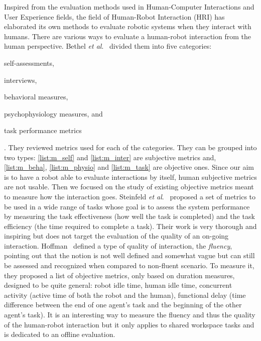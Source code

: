 \documentclass[a4paper,11pt,twoside]{StyleThese}
\begin{document}
Inspired from the evaluation methods used in Human-Computer Interactions and User Experience fields, the field of Human-Robot Interaction (HRI) has elaborated its own methods to evaluate robotic systems when they interact with humans. There are various ways to evaluate a human-robot interaction from the human perspective. Bethel \textit{et al}.~\cite{bethel_2010_review} divided them into five categories: \begin{inlineEnumerate}
	\item self-assessments,\label{list:m_self}
	\item interviews,\label{list:m_inter}
	\item behavioral measures,\label{list:m_beha}
	\item psychophysiology measures, and\label{list:m_physio}
	\item task performance metrics\label{list:m_task}
\end{inlineEnumerate}. They reviewed metrics used for each of the categories. They can be grouped into two types: \ref{list:m_self} and \ref{list:m_inter} are subjective metrics and, \ref{list:m_beha}, \ref{list:m_physio} and \ref{list:m_task} are objective ones. Since our aim is to have a robot able to evaluate interactions by itself, human subjective metrics are not usable. Then we focused on the study of existing objective metrics meant to measure how the interaction goes. Steinfeld \textit{et al}.~\cite{steinfeld_2006_common} proposed a set of metrics to be used in a wide range of tasks whose goal is to assess the system performance by measuring the task effectiveness (\ie how well the task is completed) and the task efficiency (\ie the time required to complete a task). Their work is very thorough and inspiring but does not target the evaluation of the quality of an on-going interaction. 
Hoffman~\cite{hoffman2019} defined a type of quality of interaction, the \textit{fluency}, pointing out that the notion is not well defined and somewhat vague but can still be assessed and recognized when compared to non-fluent scenario. To measure it, they proposed a list of objective metrics, only based on duration measures, designed to be quite general: robot idle time, human idle time, concurrent activity (\ie active time of both the robot and the human), functional delay (\ie time difference between the end of one agent’s task and the beginning of the other agent’s task). It is an interesting way to measure the fluency and thus the quality of the human-robot interaction but it only applies to shared workspace tasks and is dedicated to an offline evaluation.
\end{document}
